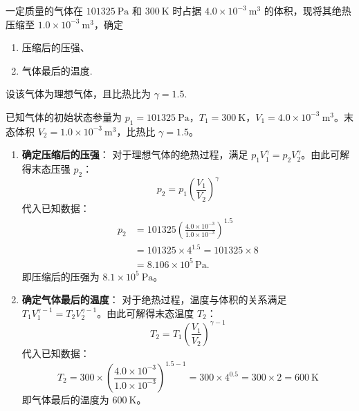 \begin{exercise}\label{ex:11.4}
一定质量的气体在 $101325 \ \mathrm{Pa}$ 和 $300 \ \mathrm{K}$ 时占据 $4.0 \times 10^{-3} \ \mathrm{m^3}$ 的体积，现将其绝热压缩至 $1.0 \times 10^{-3} \ \mathrm{m^3}$，确定
\begin{enumerate}
  \item[(a)] 压缩后的压强、
  \item[(b)] 气体最后的温度.
\end{enumerate}
设该气体为理想气体，且比热比为 $\gamma = 1.5$.
\end{exercise}
\begin{solution}
已知气体的初始状态参量为 $p_1 = 101325 \ \mathrm{Pa}$，$T_1 = 300 \ \mathrm{K}$，$V_1 = 4.0 \times 10^{-3} \ \mathrm{m^3}$。末态体积 $V_2 = 1.0 \times 10^{-3} \ \mathrm{m^3}$，比热比 $\gamma = 1.5$。

\begin{enumerate}
    \item[(a)] \textbf{确定压缩后的压强}：
    对于理想气体的绝热过程，满足 $p_1 V_1^\gamma = p_2 V_2^\gamma$。由此可解得末态压强 $p_2$：
    $$ p_2 = p_1 \left( \frac{V_1}{V_2} \right)^\gamma $$
    代入已知数据：
    \[
    \begin{aligned}
    p_2
      &=101325\left(\frac{4.0\times10^{-3}}{1.0\times10^{-3}}\right)^{1.5}\\
      &=101325\times4^{1.5}
       =101325\times8\\
      &=8.106\times10^5\,\mathrm{Pa}.
    \end{aligned}
    \]
    即压缩后的压强为 $8.1 \times 10^5 \ \mathrm{Pa}$。

    \item[(b)] \textbf{确定气体最后的温度}：
    对于绝热过程，温度与体积的关系满足 $T_1 V_1^{\gamma-1} = T_2 V_2^{\gamma-1}$。由此可解得末态温度 $T_2$：
    $$ T_2 = T_1 \left( \frac{V_1}{V_2} \right)^{\gamma-1} $$
    代入已知数据：
    $$ T_2 = 300 \times \left( \frac{4.0 \times 10^{-3}}{1.0 \times 10^{-3}} \right)^{1.5 - 1} = 300 \times 4^{0.5} = 300 \times 2 = 600 \ \mathrm{K} $$
    即气体最后的温度为 $600 \ \mathrm{K}$。
\end{enumerate}
\end{solution}

